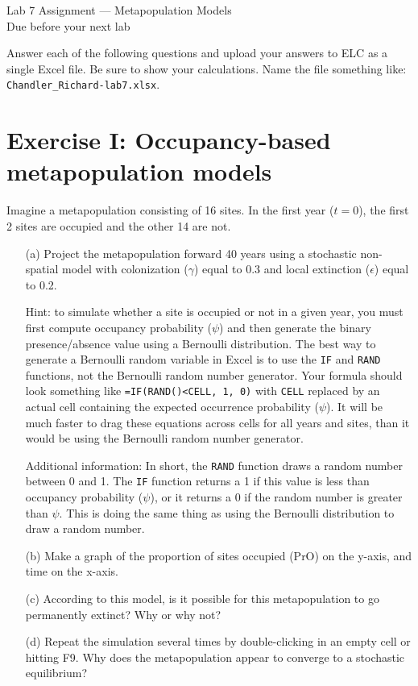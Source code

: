 \documentclass[12pt]{article}\usepackage[]{graphicx}\usepackage[]{color}
\begin{document}
{
  \Large
  \centering
  Lab 7 Assignment --- Metapopulation Models \\
  Due before your next lab \\
}

Answer each of the following questions and upload your answers to ELC
as a single Excel file. Be sure to show your calculations. Name the
file something like: \texttt{Chandler\_Richard-lab7.xlsx}. \\



\vspace{12pt}

\section*{Exercise I: Occupancy-based metapopulation models}


Imagine a metapopulation consisting of 16 sites. In the first year
($t=0$), the first 2 sites are occupied and the other 14 are not.
\begin{enumerate}
  \item[(a)] Project the metapopulation forward 40 years using a
    stochastic non-spatial model with colonization ($\gamma$) equal to
    0.3 and local extinction ($\epsilon$) equal to 0.2.

    Hint: to simulate whether a site is occupied or not in a given year,
    you must first compute occupancy probability ($\psi$) and then generate
    the binary presence/absence value using a Bernoulli distribution. The
    best way to generate a Bernoulli random variable in Excel is to use
    the \texttt{IF} and \texttt{RAND} functions, not the Bernoulli
    random number generator. Your formula should look something like
    \texttt{=IF(RAND()<CELL, 1, 0)} with \texttt{CELL} replaced by an
    actual cell containing the expected occurrence probability
    ($\psi$). It will be much faster to drag these equations across
    cells for all years and sites, than it would be using the
    Bernoulli random number generator.

    Additional information: In short, the \texttt{RAND} function draws a
    random number between 0 and 1. The \texttt{IF} function returns a 1 if
    this value is less than occupancy probability ($\psi$), or it returns
    a 0 if the random number is greater than $\psi$. This is doing the
    same thing as using the Bernoulli distribution to draw a random
    number.
  \item[(b)] Make a graph of the proportion of sites occupied (PrO)
    on the y-axis, and time on the x-axis.
  \item[(c)] According to this model, is it possible for this
    metapopulation to go permanently extinct? Why or why not?
  \item[(d)] Repeat the simulation several times by double-clicking in
    an empty cell or hitting F9. Why does the metapopulation appear to
    converge to a stochastic equilibrium?
\end{enumerate}
\end{document}
